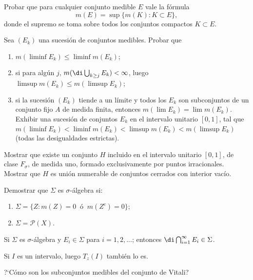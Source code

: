 \documentclass{book}
\begin{document}
    \begin{ejer}{} 
	Probar que para cualquier conjunto medible $E$ vale la fórmula
   $$m(E)=\sup\{m(K):K\subset E\}, $$
   donde el supremo se toma sobre todos los conjuntos compactos $K \subset E$.
\end{ejer} 

   \begin{ejer}{} 
	Sea $(E_k)$ una sucesión de conjuntos medibles. Probar que
	\begin{enumerate}
    \item $m(\liminf E_k)\leq \liminf m(E_k)$;
    \item si para alg\'un $j$, \;$m(\di\bigcup_{k\geq j}E_k)<\infty$, luego\; 
    $\limsup m(E_k)\leq m(\limsup E_k)$;
    \item si la sucesión $(E_k)$ tiende a un límite y todos los $E_k$ son subconjuntos
    de un conjunto fijo $A$ de medida finita, entonces \;$m(\lim E_k)=\lim m(E_k)$.
    \\
    Exhibir una sucesión de conjuntos $E_k$ en el intervalo unitario $[0,1]$, tal que 
    $m(\liminf E_k)<\liminf m(E_k)<\limsup m(E_k)<m(\limsup E_k)$  (todas las desigualdades estrictas).
	\end{enumerate}
	\end{ejer} 

   \begin{ejer}{} 
	Mostrar que existe un conjunto $H$ incluido en el intervalo unitario $[0,1]$, de clase
  $F_{\sigma}$, de medida uno, formado exclusivamente por puntos irracionales. 
  \\
  Mostrar que $H$ es unión numerable de conjuntos cerrados con interior vacío.
\end{ejer} 

   \begin{ejer}{} 
	Demostrar que $\Sigma$ es $\sigma$-álgebra si:
	\begin{enumerate}
    \item $\Sigma=\{Z:m(Z)=0 \;\;\text{ó}\;\; m(Z^c)=0\}$;
    \item $\Sigma=\mathcal{P}(X)$.
	\end{enumerate}
	\end{ejer} 

   \begin{ejer}{} 
	Si $\Sigma$ es $\sigma$-álgebra y $E_i \in  \Sigma$ para $i=1,2,...$; entonces\;
  $\di\bigcap_{i=1}^{\infty} E_i \in \Sigma$.
	\end{ejer} 

   \begin{ejer}{} 
	Si $I$ es un intervalo, luego $T_z(I)$ también lo es.
	\end{ejer} 
  
   \begin{ejer}{} 
	?`Cómo son los subconjuntos medibles del conjunto de Vitali?
\end{ejer} 
\end{document}
